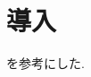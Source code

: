 \documentclass[main.tex]{subfiles}
\begin{document}
\section{導入}
    \cite{Bourbaki_E1, Bourbaki_E2} を参考にした.
\end{document}

